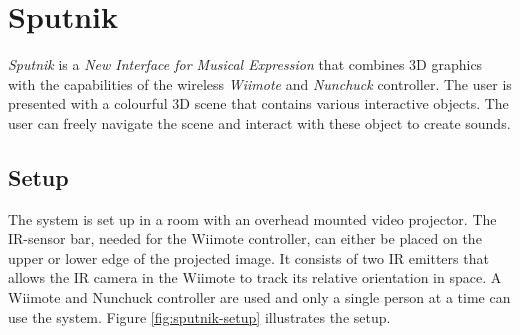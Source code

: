 \documentclass[10pt,a4paper]{scrartcl}
\begin{document}














\section{Sputnik}
\emph{Sputnik} is a \emph{New Interface for Musical Expression} that combines 3D graphics with the capabilities of the wireless \emph{Wiimote} and \emph{Nunchuck} controller. The user is presented with a colourful 3D scene that contains various interactive objects. The user can freely navigate the scene and interact with these object to create sounds.

\subsection{Setup}
The system is set up in a room with an overhead mounted video projector. The IR-sensor bar, needed for the Wiimote controller, can either be placed on the upper or lower edge of the projected image. It consists of two IR emitters that allows the IR camera in the Wiimote to track its relative orientation in space. A Wiimote and Nunchuck controller are used and only a single person at a time can use the system. Figure \ref{fig:sputnik-setup} illustrates the setup.
\end{document}
